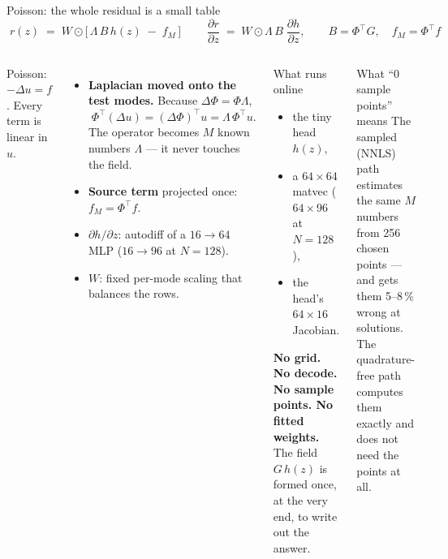 \documentclass[10pt,aspectratio=169]{beamer}
\newcommand{\T}{^{\top}}
\begin{document}
\begin{frame}{Poisson: the whole residual is a small table}
  \[
    \boxed{\;r(z) \;=\; W\odot\big[\,\Lambda\,B\,h(z) \;-\; f_M\,\big]\;}\qquad
    \frac{\partial r}{\partial z} \;=\; W\odot\Lambda\,B\;\frac{\partial h}{\partial z},\qquad B=\Phi\T G,\quad f_M=\Phi\T f
  \]
  \footnotesize
  \begin{columns}[T]
    Poisson: $-\Delta u = f$. Every term is linear in $u$.
    \begin{itemize}
      \item \textbf{Laplacian moved onto the test modes.} Because $\Delta\Phi=\Phi\Lambda$,
        $\;\Phi\T(\Delta u) = (\Delta\Phi)\T u = \Lambda\,\Phi\T u.$
        The operator becomes $M$ known numbers $\Lambda$ --- it never touches the field.
      \item \textbf{Source term} projected once: $f_M=\Phi\T f$.
      \item $\partial h/\partial z$: autodiff of a $16\!\to\!64$ MLP ($16\!\to\!96$ at $N=128$).
      \item $W$: fixed per-mode scaling that balances the rows.
    \end{itemize}
    \begin{block}{What runs online}
      \begin{itemize}
        \item the tiny head $h(z)$,
        \item a $64\times64$ matvec ($64\times96$ at $N=128$),
        \item the head's $64\times16$ Jacobian.
      \end{itemize}
      \textbf{No grid. No decode. No sample points. No fitted weights.}
      The field $G\,h(z)$ is formed once, at the very end, to write out the answer.
    \end{block}
    \begin{block}{What ``0 sample points'' means}
      The sampled (NNLS) path estimates the same $M$ numbers from 256 chosen points --- and gets them 5--8\,\% wrong at solutions. The quadrature-free path computes them exactly and does not need the points at all.
    \end{block}
  \end{columns}
\end{frame}
\end{document}
